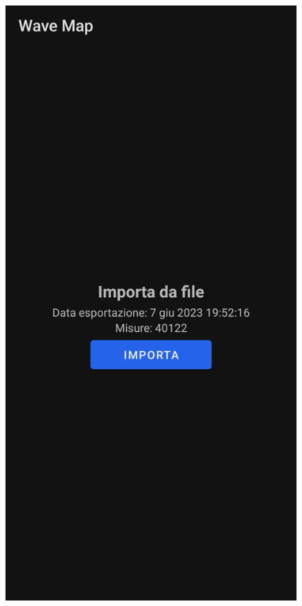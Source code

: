 \documentclass{beamer}
\begin{document}
\begin{frame}
\begin{figure}[H]
\begin{minipage}[b]{0.25\textwidth}
        \end{minipage}
        \hspace*{1cm}
        \begin{minipage}[b]{0.25\textwidth}
          \includegraphics[width=\textwidth]{./img/overview/import.jpg}
        \end{minipage}
    \end{figure}
\end{frame}
\end{document}
